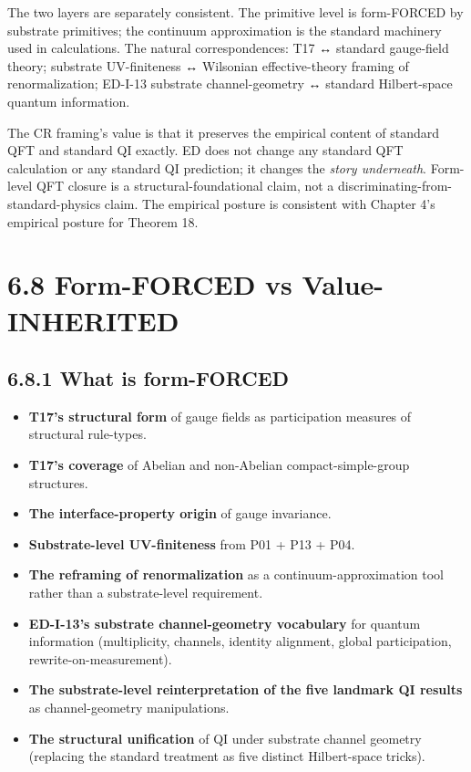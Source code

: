 \documentclass[11pt]{book}
\begin{document}
The two layers are separately consistent. The primitive level is form-FORCED by substrate primitives; the continuum approximation is the standard machinery used in calculations. The natural correspondences: T17 ↔ standard gauge-field theory; substrate UV-finiteness ↔ Wilsonian effective-theory framing of renormalization; ED-I-13 substrate channel-geometry ↔ standard Hilbert-space quantum information.

The CR framing's value is that it preserves the empirical content of standard QFT and standard QI exactly. ED does not change any standard QFT calculation or any standard QI prediction; it changes the \textit{story underneath}. Form-level QFT closure is a structural-foundational claim, not a discriminating-from-standard-physics claim. The empirical posture is consistent with Chapter 4's empirical posture for Theorem 18.

\section{6.8 Form-FORCED vs Value-INHERITED}

\subsection{6.8.1 What is form-FORCED}

\begin{itemize}
\item \textbf{T17's structural form} of gauge fields as participation measures of structural rule-types.
\item \textbf{T17's coverage} of Abelian and non-Abelian compact-simple-group structures.
\item \textbf{The interface-property origin} of gauge invariance.
\item \textbf{Substrate-level UV-finiteness} from P01 + P13 + P04.
\item \textbf{The reframing of renormalization} as a continuum-approximation tool rather than a substrate-level requirement.
\item \textbf{ED-I-13's substrate channel-geometry vocabulary} for quantum information (multiplicity, channels, identity alignment, global participation, rewrite-on-measurement).
\item \textbf{The substrate-level reinterpretation of the five landmark QI results} as channel-geometry manipulations.
\item \textbf{The structural unification} of QI under substrate channel geometry (replacing the standard treatment as five distinct Hilbert-space tricks).
\end{itemize}
\end{document}
